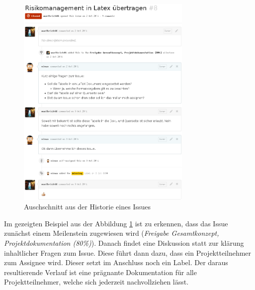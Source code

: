 \begin{figure}[h!]
	\centering
	\includegraphics[width=0.75\textwidth]{../../fig/github/issue_comment.png}
	\caption{Auschschnitt aus der Historie eines Issues}
	\label{fig:comment}
\end{figure}

Im gezeigten Beispiel aus der Abbildung \ref{fig:comment} ist zu erkennen,
dass das \gls{Issue} zunächst einem Meilenstein zugewiesen wird
(\emph{Freigabe Gesamtkonzept, Projektdokumentation (80\%)}). Danach findet
eine Diskussion statt zur klärung inhaltlicher Fragen zum \gls{Issue}. Diese
führt dann dazu, dass ein Projektteilnehmer zum \gls{Assignee} wird. Dieser
setzt im Anschluss noch ein \gls{Label}. Der daraus resultierende Verlauf ist
eine prägnante Dokumentation für alle Projektteilnehmer, welche sich
jederzeit nachvollziehen lässt.
